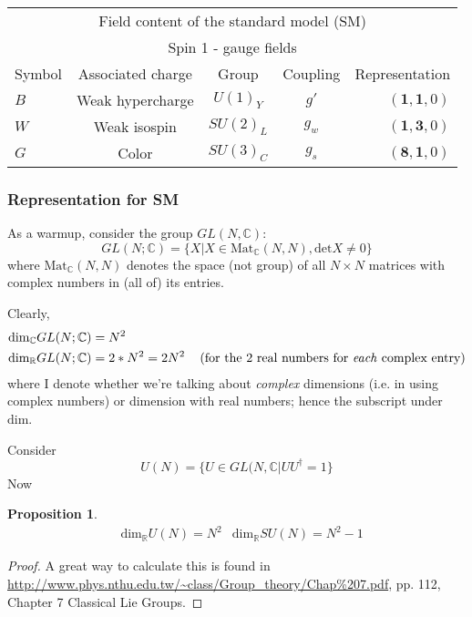 \documentclass[10pt]{amsart}
\newtheorem{proposition}{Proposition}
\begin{document}
\begin{multicols}{2}
\begin{tabular}{l c c c r }
\multicolumn{5}{c}{Field content of the standard model (SM)} \\
\multicolumn{5}{c}{Spin 1 - gauge fields } \\
Symbol & Associated charge & Group & Coupling & Representation \\ 
$B$ & Weak hypercharge & $U(1)_Y$ & $g'$ & $( \mathbf{1}, \mathbf{1}, 0)$ \\
$W$ & Weak isospin & $SU(2)_L$ & $g_w$   & $(\mathbf{1}, \mathbf{3} , 0 )$ \\ 
$G$ & Color & $SU(3)_C$ & $g_s$ & $(\mathbf{8}, \mathbf{1}, 0)$  \\
\end{tabular}

\subsubsection{Representation for SM}

As a warmup, consider the group $GL(N,\mathbb{C})$:
\[
GL(N;\mathbb{C}) = \lbrace X | X \in \text{Mat}_{\mathbb{C}}(N,N), \text{det}X \neq 0 \rbrace
\]
where $\text{Mat}_{\mathbb{C}}(N,N)$ denotes the space (not group) of all $N\times N$ matrices with complex numbers in (all of) its entries.

Clearly, 
\[
\begin{aligned}
  & \text{dim}_{\mathbb{C}}GL(N;\mathbb{C}) = N^2 \\ 
  & \text{dim}_{\mathbb{R}}GL(N;\mathbb{C}) = 2*N^2 = 2N^2 \quad \, (\text{for the 2 real numbers for \emph{each} complex entry})
\end{aligned}
\]
where I denote whether we're talking about \emph{complex} dimensions (i.e. in using complex numbers) or dimension with real numbers; hence the subscript under $\text{dim}$.  

Consider 
\[
U(N) = \lbrace U \in GL(N,\mathbb{C} | UU^{\dag} = 1\rbrace
\]
Now
\begin{proposition}
  \[
\begin{aligned}
& \text{dim}_{\mathbb{R}}U(N) = N^2
& \text{dim}_{\mathbb{R}}SU(N) = N^2 -1
\end{aligned}
\]
\end{proposition}
\begin{proof}
A great way to calculate this is found in \url{http://www.phys.nthu.edu.tw/~class/Group_theory/Chap%207.pdf}, pp. 112, Chapter 7 Classical Lie Groups.  


\end{proof}
\end{multicols}
\end{document}
